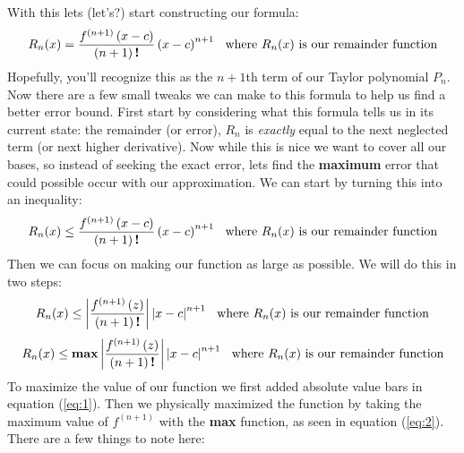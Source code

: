\documentclass[addpoints]{exam}
\begin{document}
\begin{tcolorbox}[title=TAYLOR'S THEOREM (LAGRANGE ERROR) (cont.) ,colframe=black,sharp corners,colback=white,colbacktitle=white,coltitle=black]
    With this lets (let's?) start constructing our formula:
    \[\displaystyle
        R_n(x) = \frac{f^{\left(n+1\right)}\left(x-c\right)}{\left(n+1\right)\textbf{!}}\left(x-c\right)^{n+1} \hspace{0.1in} \text{where $R_n(x)$ is our remainder function}
    \]
    Hopefully, you'll recognize this as the $n+1$th term of our Taylor polynomial $P_n$. Now there are a few small tweaks we can make to this formula to help us find a better error bound.
    \vspace{0.1in}
    \newline
    First start by considering what this formula tells us in its current state: the remainder (or error), $R_n$ is \textit{exactly} equal to the next neglected term (or next higher derivative). Now while this is nice we want to cover all our bases, so instead of seeking the exact error, lets find the \textbf{maximum} error that could possible occur with our approximation. We can start by turning this into an inequality:
    \begin{equation*}
        R_n(x) \leq \frac{f^{\left(n+1\right)}\left(x-c\right)}{\left(n+1\right)\textbf{!}}\left(x-c\right)^{n+1} \hspace{0.1in} \text{where $R_n(x)$ is our remainder function}
    \end{equation*}
    Then we can focus on making our function as large as possible. We will do this in two steps:
    \begin{equation}\label{eq:1}
        R_n(x) \leq \left| \frac{f^{\left(n+1\right)}\left(z\right)}{\left(n+1\right)\textbf{!}}\right|\left|x-c\right|^{n+1} \hspace{0.1in} \text{where $R_n(x)$ is our remainder function}
    \end{equation}
    \begin{equation}\label{eq:2}
        R_n(x) \leq \textbf{max}\left| \frac{f^{\left(n+1\right)}\left(z\right)}{\left(n+1\right)\textbf{!}}\right|\left|x-c\right|^{n+1} \hspace{0.1in} \text{where $R_n(x)$ is our remainder function}
    \end{equation}
    To maximize the value of our function we first added absolute value bars in equation (\ref{eq:1}). Then we physically maximized the function by taking the maximum value of $f^{\left(n+1\right)}$ with the \textbf{max} function, as seen in equation (\ref{eq:2}). There are a few things to note here:

\end{tcolorbox}
\end{document}
